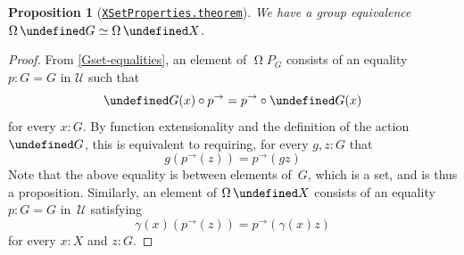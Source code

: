 \documentclass[10pt,a4paper]{amsart}
\newtheorem{proposition}[theorem]{Proposition}
\theoremstyle{definition}
\newcommand{\equivto}{\simeq} %
\newcommand{\transport}[1]{#1^\to} %
\newcommand{\Loop}{\operatorname{\Omega}} %
\let\P\undefined
\newcommand{\P}[1]{\operatorname{P}_{#1}} %
\newcommand{\U}{\mathcal{U}} %
\newcommand{\agda}[2]{\href{https://smimram.github.io/generated-deloopings-agda/#1.html\##2}{\texttt{#1.#2}}}
\begin{document}
\begin{proposition}[\agda{XSetProperties}{theorem}]
  \label{PG-loop-restriction}
  We have a group equivalence
  $
  \Loop\P G\equivto\Loop \P X
  $.
\end{proposition}
\begin{proof}
  From \cref{Gset-equalities}, an element of $\Loop P_G$ consists of an equality
  $p:G=G$ in $\U$ such that
  \[
    \P G(x)\circ\transport p=\transport p\circ\P G(x)
  \]
  for every $x:G$. By function extensionality and the definition of the action $\P G$, this is equivalent to
  requiring, for every $g,z:G$ that
  \begin{equation}
    \label{eq:PG-condition}
    g(\transport p(z))=\transport p(gz)
  \end{equation}
  Note that the above equality is between elements of~$G$, which is a set, and is
  thus a proposition.
  Similarly, an element of $\Loop \P X$ consists of an equality $p:G=G$
  in~$\U$ satisfying
  \begin{equation}
    \label{eq:PX-condition}
    \gamma(x)(\transport p(z))=\transport p(\gamma(x)z)
  \end{equation}
  for every $x:X$ and $z:G$.


\end{proof}
\end{document}
